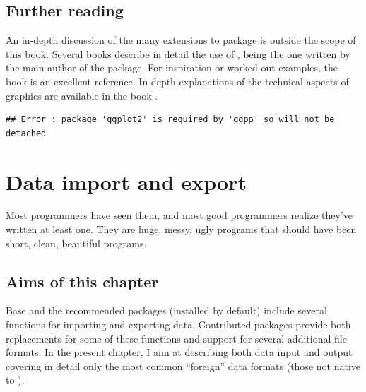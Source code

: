 \documentclass[krantz2]{krantz}\usepackage{knitr}
\begin{document}
\section{Further reading}
An in-depth discussion of the many extensions to package  is outside the scope of this book. Several books describe in detail the use of , being  \autocite{Wickham2016} the one written by the main author of the package. For inspiration or worked out examples, the book  \autocite{Chang2018} is an excellent reference. In depth explanations of the technical aspects of \Rlang graphics are available in the book  \autocite{Murrell2019}.

\begin{knitrout}\footnotesize
{}\color{fgcolor}\begin{kframe}
\begin{verbatim}
## Error : package 'ggplot2' is required by 'ggpp' so will not be detached
\end{verbatim}
\end{kframe}
\end{knitrout}







\chapter{Data import and export}\label{chap:R:data:io}\label{sec:data:io}

\begin{VF}
Most programmers have seen them, and most good programmers realize they've written at least one. They are huge, messy, ugly programs that should have been short, clean, beautiful programs.

\end{VF}



\section{Aims of this chapter}

Base \Rlang and the recommended packages (installed by default) include several functions for importing and exporting data. Contributed packages provide both replacements for some of these functions and support for several additional file formats. In the present chapter, I aim at describing both data input and output covering in detail only the most common ``foreign'' data formats (those not native to \Rlang).
\end{document}
